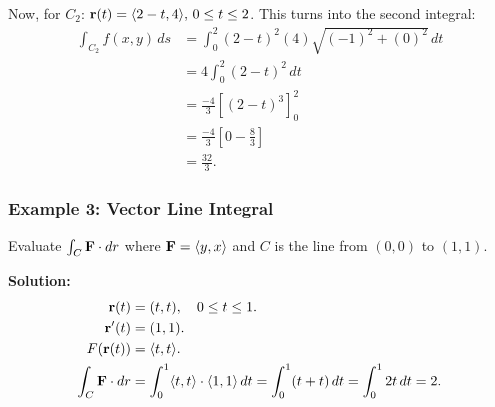 Now, for \(C_{2}\): \(\mathbf{r}(t) = \langle 2 - t, 4\rangle, \, 0 \leq t \leq 2\). This turns into the second integral:
\begin{align*}
    \int_{C_{2}} f(x,y) \, ds &= \int_{0}^{2} (2 - t)^{2}(4) \sqrt{(-1)^{2} + (0)^{2}} \, dt \\
    &= 4\int_{0}^{2} (2 - t)^{2} \, dt \\
    &= \tfrac{-4}{3}\left[ (2 - t)^{3} \right]_{0}^{2} \\
    &= \tfrac{-4}{3}\left[ 0 - \tfrac{8}{3} \right] \\
    &= \tfrac{32}{3}.
\end{align*}

\subsubsection{Example 3: Vector Line Integral}
Evaluate \( \int_C \mathbf{F} \cdot dr \) where \( \mathbf{F} = \langle y, x \rangle \) and \( C \) is the line from \( (0,0) \) to \( (1,1) \).

\textbf{Solution:}
\begin{align*}
    \mathbf{r}(t) &= (t, t), \quad 0 \leq t \leq 1. \\
    \mathbf{r}'(t) &= (1,1). \\
    F(\mathbf{r}(t)) &= \langle t, t \rangle. \\
    \int_C \mathbf{F} \cdot dr &= \int_0^1 \langle t, t \rangle \cdot \langle 1, 1 \rangle \, dt = \int_0^1 (t + t) \, dt = \int_0^1 2t \, dt = 2.
\end{align*}
